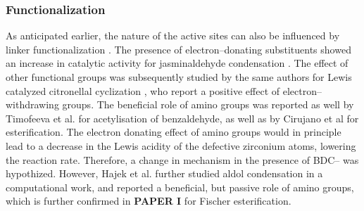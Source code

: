 \subsubsection{Functionalization}
As anticipated earlier, the nature of the active sites can also be influenced by linker functionalization \cite{kandiah2010synthesis, kandiah2010post, kim2012discovery}. 
The presence of electron--donating substituents showed an increase in catalytic activity for jasminaldehyde condensation \cite{vermoortele2011amino}. The effect of other functional groups was subsequently studied by the same authors for Lewis catalyzed citronellal cyclization \cite{vermoortele2012electronic}, who report a positive effect of electron--withdrawing groups. The beneficial role of amino groups was reported as well by Timofeeva et al. \cite{timofeeva2014effects} for acetylisation of benzaldehyde, as well as by Cirujano et al \cite{cirujano2015zirconium, cirujano2015conversion} for esterification. The electron donating effect of amino groups would in principle lead to a decrease in the Lewis acidity of the defective zirconium atoms, lowering the reaction rate. Therefore, a change in mechanism in the presence of BDC-- was hypothized. However, Hajek et al. further studied aldol condensation in a computational work, and reported a beneficial, but passive role of amino groups, which is further confirmed in \textbf{PAPER I} for Fischer esterification. 

